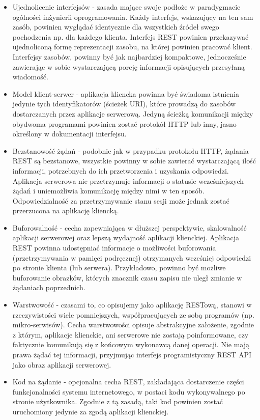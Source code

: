 \begin{itemize}
    \item Ujednolicenie interfejsów - zasada mające swoje podłoże w paradygmacie ogólności inżynierii oprogramowania. Każdy interfejs, wskazujący na ten sam zasób, powinien wyglądać identycznie dla wszystkich źródeł swego pochodzenia np. dla każdego klienta. Interfejs REST powinien przekazywać ujednoliconą formę reprezentacji zasobu, na której powinien pracować klient. Interfejsy zasobów, powinny być jak najbardziej kompaktowe, jednocześnie zawierając w sobie wystarczającą porcję informacji opisujących przesyłaną wiadomość.
    \item Model klient-serwer - aplikacja kliencka powinna być świadoma istnienia jedynie tych identyfikatorów (ścieżek URI), które prowadzą do zasobów dostarczanych przez aplikacje serwerową. Jedyną ścieżką komunikacji między obydwoma programami powinien zostać protokół HTTP lub inny, jasno określony w dokumentacji interfejsu.
    \item Bezstanowość żądań - podobnie jak w przypadku protokołu HTTP, żądania REST są bezstanowe, wszystkie powinny w sobie zawierać wystarczającą ilość informacji, potrzebnych do ich przetworzenia i uzyskania odpowiedzi. Aplikacja serwerowa nie przetrzymuje informacji o statusie wcześniejszych żądań i uniemożliwia komunikację między nimi w ten sposób. Odpowiedzialność za przetrzymywanie stanu sesji może jednak zostać przerzucona na aplikację kliencką.
    \item Buforowalność - cecha zapewniająca w dłuższej perspektywie, skalowalność aplikacji serwerowej oraz lepszą wydajność aplikacji klienckiej. Aplikacja REST powinna udostępniać informacje o możliwości buforowania (przetrzymywania w pamięci podręcznej) otrzymanych wcześniej odpowiedzi po stronie klienta (lub serwera). Przykładowo, powinno być możliwe buforowanie obrazków, których znacznik czasu zapisu nie uległ zmianie w żądaniach poprzednich.
    \item Warstwowość - czasami to, co opisujemy jako aplikację RESTową, stanowi w rzeczywistości wiele pomniejszych, współpracujących ze sobą programów (np. mikro-serwisów). Cecha warstwowości opisuje abstrakcyjne założenie, zgodnie z którym, aplikacje klienckie, ani serwerowe nie zostają poinformowane, czy faktycznie komunikują się z końcowym wykonawcą danej operacji. Nie mają prawa żądać tej informacji, przyjmując interfejs programistyczny REST API jako obraz aplikacji serwerowej.
    \item Kod na żądanie - opcjonalna cecha REST, zakładająca dostarczenie części funkcjonalności systemu internetowego, w postaci kodu wykonywalnego po stronie użytkownika. Zgodnie z tą zasadą, taki kod powinien zostać uruchomiony jedynie za zgodą aplikacji klienckiej.
\end{itemize}

